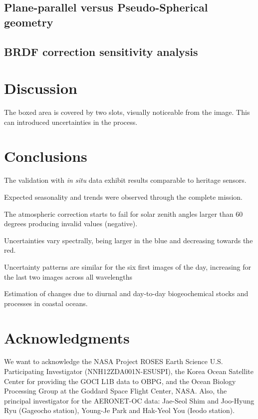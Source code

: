 \documentclass[onecolumn,3p,letterpaper,11pt]{elsarticle}
\begin{document}
\subsection{Plane-parallel versus Pseudo-Spherical geometry}

\subsection{BRDF correction sensitivity analysis}
\section{Discussion} 
The boxed area is covered by two slots, visually noticeable from the image. This can introduced uncertainties in the process.

\section{Conclusions}

The validation with {\it in situ} data exhibit results comparable to heritage sensors.

Expected seasonality and trends were observed through the complete mission.

The atmospheric correction starts to fail for solar zenith angles larger than 60 degrees producing invalid values (negative). 

Uncertainties vary spectrally, being larger in the blue and decreasing towards the red.

Uncertainty patterns are similar for the six first images of the day, increasing for the last two images across all wavelengths

Estimation of changes due to diurnal and day-to-day biogeochemical stocks and processes in coastal oceans.


\section*{Acknowledgments}
\vspace{-.2cm}
We want to acknowledge the NASA Project ROSES Earth Science U.S. Participating Investigator (NNH12ZDA001N-ESUSPI), the Korea Ocean Satellite Center for providing the GOCI L1B data to OBPG, and the Ocean Biology Processing Group at the Goddard Space Flight Center, NASA. Also, the principal investigator for the AERONET-OC data: Jae-Seol Shim and Joo-Hyung Ryu (Gageocho station), Young-Je Park and Hak-Yeol You (Ieodo station).
\end{document}
